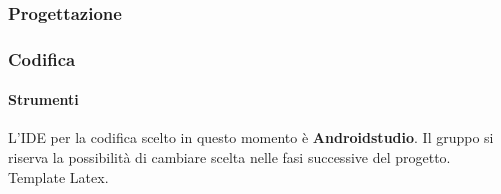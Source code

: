 \documentclass[a4paper,12pt]{article}
\begin{document}
		\subsubsection{Progettazione}
		\subsubsection{Codifica}
			\paragraph{Strumenti}
			L'IDE per la codifica scelto in questo momento è \textbf{\gls{Android}\g studio}. Il gruppo si riserva la possibilità di cambiare scelta nelle fasi successive del progetto. \gls{Template Latex}\g.
\printglossary[style=indexgroup]
\end{document}
